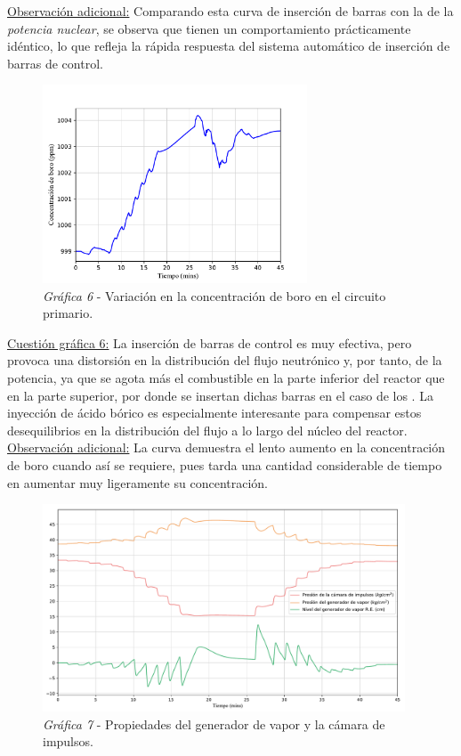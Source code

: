 \underline{Observación adicional:} Comparando esta curva de inserción de barras con la de la \textit{potencia nuclear}, se observa que tienen un comportamiento prácticamente idéntico, lo que refleja la rápida respuesta del sistema automático de inserción de barras de control.

\begin{figure}[h]
  \centering
  \includegraphics[width=0.7\textwidth]{content/figures/sim1_boro.pdf}
  \caption{\textit{Gráfica 6} - Variación en la concentración de boro en el circuito primario.}
  \label{fig:sim1_boro}
\end{figure}

\underline{Cuestión gráfica 6:} La inserción de barras de  control es muy efectiva, pero provoca una distorsión en la distribución del flujo neutrónico y, por tanto, de la potencia, ya que se agota más el combustible en la parte inferior del reactor que en la parte superior, por donde se insertan dichas barras en el caso de los . La inyección de ácido bórico es especialmente interesante para compensar estos desequilibrios en la distribución del flujo a lo largo del núcleo del reactor.
\underline{Observación adicional:} La curva demuestra el lento aumento en la concentración de boro cuando así se requiere, pues tarda una cantidad considerable de tiempo en aumentar muy ligeramente su concentración.

\begin{figure}[!h]
  \centering
  \includegraphics[width=0.96\textwidth]{content/figures/sim1_gen_vapor_camara_imp.pdf}
  \caption{\textit{Gráfica 7} - Propiedades del generador de vapor y la cámara de impulsos.}
  \label{fig:sim1_gen_vapor_camara_imp}
\end{figure}

